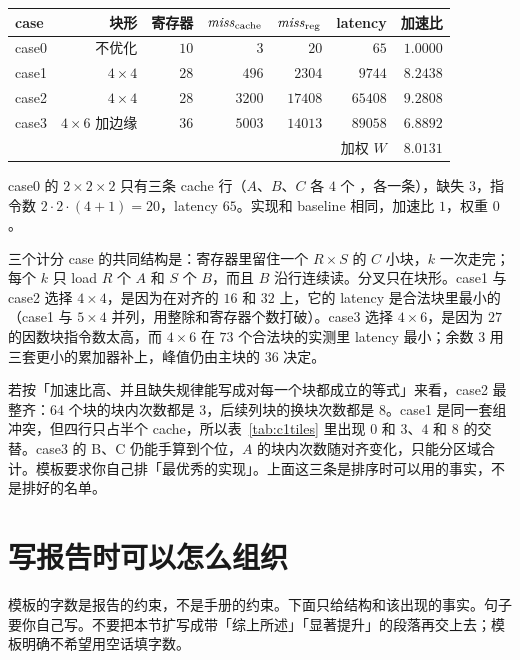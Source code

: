 \begin{center}
\label{tab:all}
\small
\setlength{\tabcolsep}{4pt}
\begin{tabular}{@{}lrrrrrr@{}}
\toprule
case & 块形 & 寄存器 & $\mathit{miss}_{\mathrm{cache}}$ & $\mathit{miss}_{\mathrm{reg}}$ & latency & 加速比\\
\midrule
case0 & 不优化 & $10$ & $3$ & $20$ & $65$ & $1.0000$\\
case1 & $4\times4$ & $28$ & $496$ & $2304$ & $9744$ & $8.2438$\\
case2 & $4\times4$ & $28$ & $3200$ & $17408$ & $65408$ & $9.2808$\\
case3 & $4\times6$ 加边缘 & $36$ & $5003$ & $14013$ & $89058$ & $6.8892$\\
\midrule
\multicolumn{6}{r}{加权 $W$} & $8.0131$\\
\bottomrule
\end{tabular}
\end{center}

case0 的 $2\times2\times2$ 只有三条 cache 行（$A$、$B$、$C$ 各 $4$ 个 ，各一条），缺失 $3$，指令数 $2\cdot2\cdot(4+1)=20$，latency $65$。实现和 baseline 相同，加速比 $1$，权重 $0$。

三个计分 case 的共同结构是：寄存器里留住一个 $R\times S$ 的 $C$ 小块，$k$ 一次走完；每个 $k$ 只 load $R$ 个 $A$ 和 $S$ 个 $B$，而且 $B$ 沿行连续读。分叉只在块形。case1 与 case2 选择 $4\times4$，是因为在对齐的 $16$ 和 $32$ 上，它的 latency 是合法块里最小的（case1 与 $5\times4$ 并列，用整除和寄存器个数打破）。case3 选择 $4\times6$，是因为 $27$ 的因数块指令数太高，而 $4\times6$ 在 $73$ 个合法块的实测里 latency 最小；余数 $3$ 用三套更小的累加器补上，峰值仍由主块的 $36$ 决定。

若按「加速比高、并且缺失规律能写成对每一个块都成立的等式」来看，case2 最整齐：$64$ 个块的块内次数都是 $3$，后续列块的换块次数都是 $8$。case1 是同一套组冲突，但四行只占半个 cache，所以表~\ref{tab:c1tiles} 里出现 $0$ 和 $3$、$4$ 和 $8$ 的交替。case3 的 B、C 仍能手算到个位，$A$ 的块内次数随对齐变化，只能分区域合计。模板要求你自己排「最优秀的实现」。上面这三条是排序时可以用的事实，不是排好的名单。

\section{写报告时可以怎么组织}
\label{sec:write}

模板的字数是报告的约束，不是手册的约束。下面只给结构和该出现的事实。句子要你自己写。不要把本节扩写成带「综上所述」「显著提升」的段落再交上去；模板明确不希望用空话填字数。

